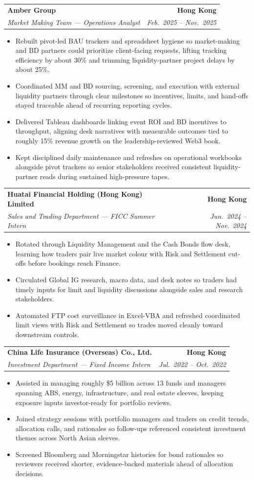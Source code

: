\documentclass[9pt,a4paper]{extarticle}
\makeatletter
\newcommand{\resumeSubheading}[4]{%
  \vspace{0.6em}%
  \begin{tabular*}{\textwidth}{l@{\extracolsep{\fill}}r}
    \textbf{#1} & \textbf{#2} \\
    \textit{\small #3} & \textit{\small #4} \\
  \end{tabular*}\vspace{0.32em}}
\makeatother
\begin{document}
\resumeSubheading{Amber Group}{Hong Kong}{Market Making Team --- Operations Analyst}{Feb.\ 2025 -- Nov.\ 2025}
\begin{itemize}
  \item Rebuilt pivot-led BAU trackers and spreadsheet hygiene so market-making and BD partners could prioritize client-facing requests, lifting tracking efficiency by about 30\% and trimming liquidity-partner project delays by about 25\%.
  \item Coordinated MM and BD sourcing, screening, and execution with external liquidity partners through clear milestones so incentives, limits, and hand-offs stayed traceable ahead of recurring reporting cycles.
  \item Delivered Tableau dashboards linking event ROI and BD incentives to throughput, aligning desk narratives with measurable outcomes tied to roughly 15\% revenue growth on the leadership-reviewed Web3 book.
  \item Kept disciplined daily maintenance and refreshes on operational workbooks alongside pivot trackers so senior stakeholders received consistent liquidity-partner reads during sustained high-pressure tapes.
\end{itemize}

\resumeSubheading{Huatai Financial Holding (Hong Kong) Limited}{Hong Kong}{Sales and Trading Department --- FICC Summer Intern}{Jun.\ 2024 -- Nov.\ 2024}
\begin{itemize}
  \item Rotated through Liquidity Management and the Cash Bonds flow desk, learning how traders pair live market colour with Risk and Settlement cut-offs before bookings reach Finance.
  \item Circulated Global IG research, macro data, and desk notes so traders had timely inputs for limit and liquidity discussions alongside sales and research stakeholders.
  \item Automated FTP cost surveillance in Excel-VBA and refreshed coordinated limit views with Risk and Settlement so trades moved cleanly toward downstream controls.
\end{itemize}

\resumeSubheading{China Life Insurance (Overseas) Co., Ltd.}{Hong Kong}{Investment Department --- Fixed Income Intern}{Jul.\ 2022 -- Oct.\ 2022}
\begin{itemize}
  \item Assisted in managing roughly \$5 billion across 13 funds and managers spanning ABS, energy, infrastructure, and real estate sleeves, keeping exposure inputs investor-ready for portfolio reviews.
  \item Joined strategy sessions with portfolio managers and traders on credit trends, allocation calls, and rationales so follow-ups referenced consistent investment themes across North Asian sleeves.
  \item Screened Bloomberg and Morningstar histories for bond rationales so reviewers received shorter, evidence-backed materials ahead of allocation decisions.
\end{itemize}
\end{document}
